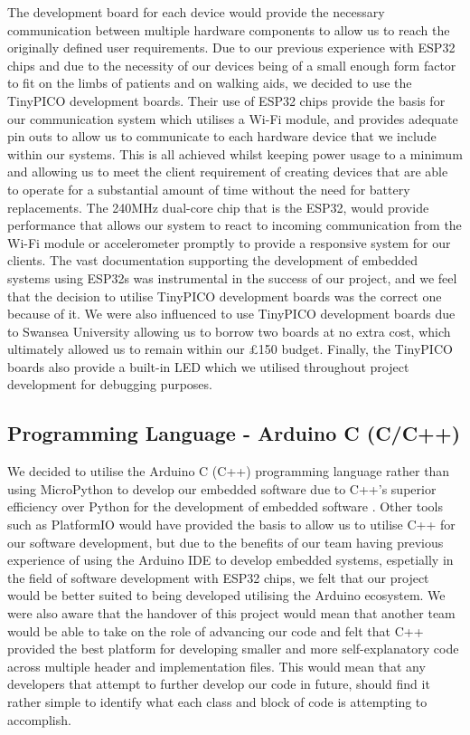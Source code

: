             The development board for each device would provide the necessary communication between multiple hardware components to allow us to reach the originally defined user requirements. Due to our previous experience with ESP32 chips and due to the necessity of our devices being of a small enough form factor to fit on the limbs of patients and on walking aids, we decided to use the TinyPICO development boards. Their use of ESP32 chips provide the basis for our communication system which utilises a Wi-Fi module, and provides adequate pin outs to allow us to communicate to each hardware device that we include within our systems. This is all achieved whilst keeping power usage to a minimum and allowing us to meet the client requirement of creating devices that are able to operate for a substantial amount of time without the need for battery replacements. The 240MHz dual-core chip that is the ESP32, would provide performance that allows our system to react to incoming communication from the Wi-Fi module or accelerometer promptly to provide a responsive system for our clients. The vast documentation supporting the development of embedded systems using ESP32s was instrumental in the success of our project, and we feel that the decision to utilise TinyPICO development boards was the correct one because of it. We were also influenced to use TinyPICO development boards due to Swansea University allowing us to borrow two boards at no extra cost, which ultimately allowed us to remain within our £150 budget. Finally, the TinyPICO boards also provide a built-in LED which we utilised throughout project development for debugging purposes.

        \subsection{Programming Language - Arduino C (C/C++)}
        \label{subsec:programming_language}

            We decided to utilise the Arduino C (C++) programming language rather than using MicroPython to develop our embedded software due to C++'s superior efficiency over Python for the development of embedded software \cite{github_2014, dicola}. Other tools such as PlatformIO would have provided the basis to allow us to utilise C++ for our software development, but due to the benefits of our team having previous experience of using the Arduino IDE to develop embedded systems, espetially in the field of software development with ESP32 chips, we felt that our project would be better suited to being developed utilising the Arduino ecosystem. We were also aware that the handover of this project would mean that another team would be able to take on the role of advancing our code and felt that C++ provided the best platform for developing smaller and more self-explanatory code across multiple header and implementation files. This would mean that any developers that attempt to further develop our code in future, should find it rather simple to identify what each class and block of code is attempting to accomplish.

